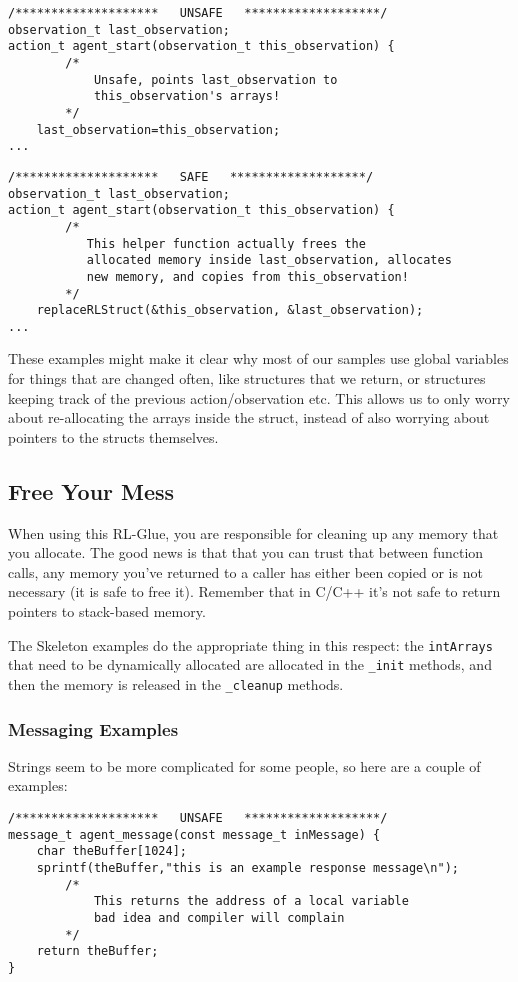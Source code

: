 \documentclass[11pt]{article}
\begin{document}
\begin{verbatim}
/********************   UNSAFE   *******************/
observation_t last_observation;
action_t agent_start(observation_t this_observation) {
        /*
            Unsafe, points last_observation to
            this_observation's arrays!
        */
    last_observation=this_observation;
...
\end{verbatim}

\begin{verbatim}
/********************   SAFE   *******************/
observation_t last_observation;
action_t agent_start(observation_t this_observation) {
        /*
           This helper function actually frees the
           allocated memory inside last_observation, allocates 
           new memory, and copies from this_observation!
        */
    replaceRLStruct(&this_observation, &last_observation);
...
\end{verbatim}

These examples might make it clear why most of our samples use global variables for things that are changed often, like structures that we return, or structures keeping track of the previous action/observation etc.  
This allows us to only worry about re-allocating the arrays inside the struct, instead of also worrying about pointers to the structs themselves.

\subsection{Free Your Mess}
When using this RL-Glue, you are responsible for cleaning up any memory that you allocate. The good news is that that you can trust that between function calls, any memory you've returned to a caller has either been
copied or is not necessary (it is safe to free it).  Remember that in C/C++ it's not safe to return pointers to stack-based memory.

The Skeleton examples do the appropriate thing in this respect: the \texttt{intArrays} that need to be dynamically allocated are allocated in the \texttt{\_init} methods, and then the memory is released in the \texttt{\_cleanup} methods.

\subsubsection{Messaging Examples}
Strings seem to be more complicated for some people, so here are a couple of examples:

\begin{verbatim}
/********************   UNSAFE   *******************/
message_t agent_message(const message_t inMessage) {
    char theBuffer[1024];
    sprintf(theBuffer,"this is an example response message\n");
        /*
            This returns the address of a local variable
            bad idea and compiler will complain
        */
    return theBuffer;
}
\end{verbatim}
\end{document}
